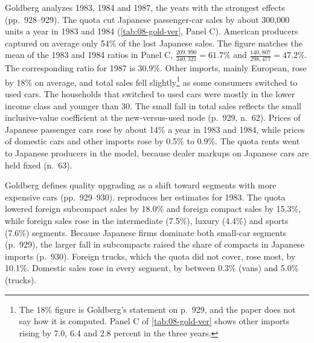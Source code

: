  Goldberg analyzes 1983, 1984 and 1987, the years with the strongest effects
(pp.~928--929). The quota cut Japanese passenger-car sales by about 300,000 units a year in 1983 and 1984
(\cref{tab:08-gold-ver}, Panel C). American producers captured on average only 54\% of the lost Japanese
sales. The figure matches the mean of the 1983 and 1984 ratios in Panel C, $\frac{209{,}990}{340{,}321} = 61.7\%$ and
$\frac{140{,}807}{298{,}477} = 47.2\%$. The corresponding ratio for 1987 is 30.9\%. Other imports, mainly European, rose by 18\% on average, and total sales fell slightly\footnote{The
18\% figure is Goldberg's statement on p.~929, and the paper does not say how it is computed. Panel C of
\cref{tab:08-gold-ver} shows other imports rising by 7.0, 6.4 and 2.8 percent in the three years.} as some consumers
switched to used cars. The households that switched to used cars were mostly in the lower income class and
younger than 30. The small fall in total sales reflects the small inclusive-value coefficient at the
new-versus-used node (p.~929, n.~62). Prices of Japanese passenger cars rose by about 14\% a year in 1983 and
1984, while prices of domestic cars and other imports rose by 0.5\% to 0.9\%. The quota rents went to Japanese
producers in the model, because dealer markups on Japanese cars are held fixed (n.~63).

 Goldberg defines quality upgrading as a shift toward segments with more expensive
cars (pp.~929--930).  reproduces her estimates for 1983. The quota lowered foreign
subcompact sales by 18.0\% and foreign compact sales by 15.3\%, while foreign sales rose in the intermediate
(7.5\%), luxury (4.4\%) and sports (7.6\%) segments. Because Japanese firms dominate both small-car
segments (p.~929), the larger fall in subcompacts raised the share of compacts in Japanese imports (p.~930).
Foreign trucks, which the quota did not cover, rose most, by 10.1\%. Domestic sales rose in every segment, by between 0.3\% (vans) and 5.0\% (trucks).

